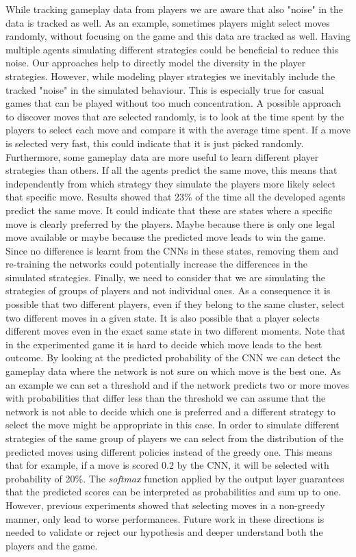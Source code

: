 While tracking gameplay data from players we are aware that also "noise" in the data is tracked as well. As an example, sometimes players might select moves randomly, without focusing on the game and this data are tracked as well. Having multiple agents simulating different strategies could be beneficial to reduce this noise. Our approaches help to directly model the diversity in the player strategies. However, while modeling player strategies we inevitably include the tracked "noise" in the simulated behaviour. This is especially true for casual games that can be played without too much concentration. A possible approach to discover moves that are selected randomly, is to look at the time spent by the players to select each move and compare it with the average time spent. If a move is selected very fast, this could indicate that it is just picked randomly.
Furthermore, some gameplay data are more useful to learn different player strategies than others.
If all the agents predict the same move, this means that independently from which strategy they simulate the players more likely select that specific move. Results showed that 23\% of the time all the developed agents predict the same move. It could indicate that these are states where a specific move is clearly preferred by the players. Maybe because there is only one legal move available or maybe because the predicted move leads to win the game. Since no difference is learnt from the \acsp{CNN} in these states, removing them and re-training the networks could potentially increase the differences in the simulated strategies.
Finally, we need to consider that we are simulating the strategies of groups of players and not individual ones. As a consequence it is possible that two different players, even if they belong to the same cluster, select two different moves in a given state. It is also possible that a player selects different moves even in the exact same state in two different moments. Note that in the experimented game it is hard to decide which move leads to the best outcome. By looking at the predicted probability of the \acs{CNN} we can detect the gameplay data where the network is not sure on which move is the best one. As an example we can set a threshold and if the network predicts two or more moves with probabilities that differ less than the threshold we can assume that the network is not able to decide which one is preferred and a different strategy to select the move might be appropriate in this case. In order to simulate different strategies of the same group of players we can select from the distribution of the predicted moves using different policies instead of the greedy one. This means that for example, if a move is scored $0.2$ by the \acs{CNN}, it will be selected with probability of 20\%. The \textit{softmax} function applied by the output layer guarantees that the predicted scores can be interpreted as probabilities and sum up to one. However, previous experiments showed that selecting moves in a non-greedy manner, only lead to worse performances. Future work in these directions is needed to validate or reject our hypothesis and deeper understand both the players and the game.


